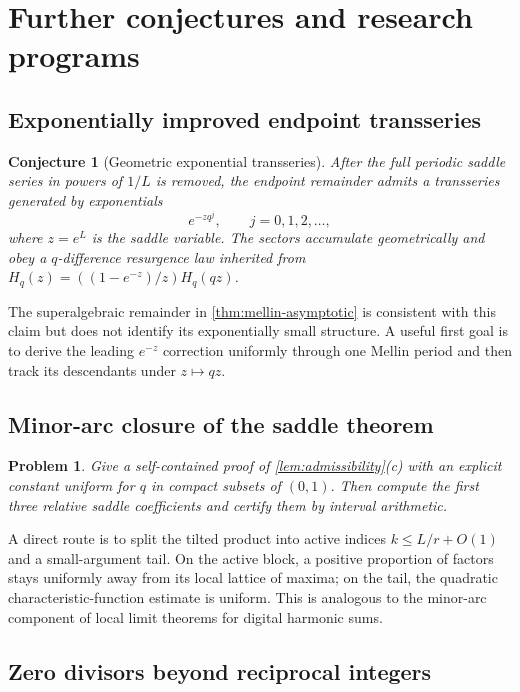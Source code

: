 \documentclass[11pt,oneside]{article}
\newtheorem{conjecture}[theorem]{Conjecture}
\newtheorem{problem}[theorem]{Problem}
\theoremstyle{definition}
\theoremstyle{remark}
\begin{document}
\section{Further conjectures and research programs}
\label{sec:future}

\subsection{Exponentially improved endpoint transseries}

\begin{conjecture}[Geometric exponential transseries]
After the full periodic saddle series in powers of $1/L$ is removed, the endpoint
remainder admits a transseries generated by exponentials
\[
 e^{-zq^j},\qquad j=0,1,2,\dots,
\]
where $z=e^L$ is the saddle variable.  The sectors accumulate geometrically and obey a
$q$-difference resurgence law inherited from
$H_q(z)=((1-e^{-z})/z)H_q(qz)$.
\end{conjecture}

The superalgebraic remainder in \cref{thm:mellin-asymptotic} is consistent with this
claim but does not identify its exponentially small structure.  A useful first goal is
to derive the leading $e^{-z}$ correction uniformly through one Mellin period and then
track its descendants under $z\mapsto qz$.

\subsection{Minor-arc closure of the saddle theorem}

\begin{problem}
Give a self-contained proof of \cref{lem:admissibility}(c) with an explicit constant
uniform for $q$ in compact subsets of $(0,1)$.  Then compute the first three relative
saddle coefficients and certify them by interval arithmetic.
\end{problem}

A direct route is to split the tilted product into active indices
$k\le L/r+O(1)$ and a small-argument tail.  On the active block, a positive proportion
of factors stays uniformly away from its local lattice of maxima; on the tail, the
quadratic characteristic-function estimate is uniform.  This is analogous to the
minor-arc component of local limit theorems for digital harmonic sums.

\subsection{Zero divisors beyond reciprocal integers}
\end{document}
